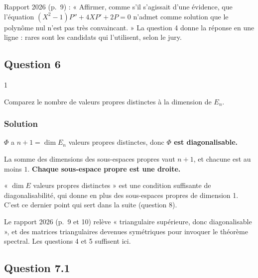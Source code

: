 \documentclass[11pt,a4paper]{article}
\begin{document}
\begin{jury}

Rapport 2026 (p.~9) : « Affirmer, comme s'il s'agissait d'une évidence, que l'équation \((X^2-1)P''+4XP'+2P=0\) n'admet comme solution que le polynôme nul n'est pas très convaincant. » La question 4 donne la réponse en une ligne : rares sont les candidats qui l'utilisent, selon le jury.

\end{jury}

\hypertarget{question-6-1}{%
\subsection{Question 6}\label{question-6-1}}

\begin{indication}{1}

Comparez le nombre de valeurs propres distinctes à la dimension de \(E_n\).

\end{indication}

\hypertarget{solution-25}{%
\subsubsection{Solution}\label{solution-25}}

\(\Phi\) a \(n+1=\dim E_n\) valeurs propres distinctes, donc \textbf{\(\Phi\) est diagonalisable.}

La somme des dimensions des sous-espaces propres vaut \(n+1\), et chacune est au moins \(1\). \textbf{Chaque sous-espace propre est une droite.}

\begin{methode}

« \(\dim E\) valeurs propres distinctes » est une condition suffisante de diagonalisabilité, qui donne en plus des sous-espaces propres de dimension 1. C'est ce dernier point qui sert dans la suite (question 8).

\end{methode}

\begin{piege}

Le rapport 2026 (p.~9 et 10) relève « triangulaire supérieure, donc diagonalisable », et des matrices triangulaires devenues symétriques pour invoquer le théorème spectral. Les questions 4 et 5 suffisent ici.

\end{piege}

\hypertarget{question-7.1-1}{%
\subsection{Question 7.1}\label{question-7.1-1}}
\end{document}

